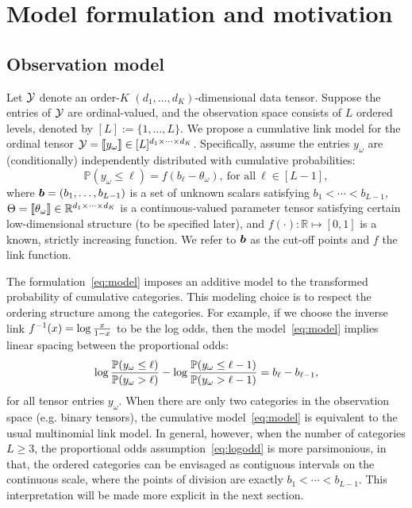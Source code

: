 \documentclass{article}
\theoremstyle{plain}
\theoremstyle{definition}
\begin{document}
\section{Model formulation and motivation}
\subsection{Observation model}
Let $\mathcal{Y}$ denote an order-$K$ $(d_1,\ldots,d_K)$-dimensional data tensor. Suppose the entries of $\mathcal{Y}$ are ordinal-valued, and the observation space consists of $L$ ordered levels, denoted by $[L]:=\{1,\ldots,L\}$. We propose a cumulative link model for the ordinal tensor $\mathcal{Y}=\llbracket y_\omega \rrbracket\in[L]^{d_1\times \cdots\times d_K}$. Specifically, assume the entries $y_\omega$ are (conditionally) independently distributed with cumulative probabilities:
\begin{equation}\label{eq:model}
\mathbb{P}(y_\omega\leq \ell)=f(b_\ell-\theta_\omega),\ \text{for all}\ \ell\in[L-1],
\end{equation}
where $\bm{b}=(b_1,\ldots,b_{L-1})$ is a set of unknown scalars satisfying $b_1<\cdots <b_{L-1}$, $\Theta=\llbracket \theta_\omega \rrbracket\in\mathbb{R}^{d_1\times \cdots \times d_K}$ is a continuous-valued parameter tensor satisfying certain low-dimensional structure (to be specified later), and $f(\cdot):\mathbb{R}\mapsto[0,1]$ is a known, strictly increasing function. We refer to $\bm{b}$ as the cut-off points and $f$ the link function. 

The formulation~\eqref{eq:model} imposes an additive model to the transformed probability of cumulative categories. This modeling choice is to respect the ordering structure among the categories. For example, if we choose the inverse link $f^{-1}(x)=\log {x\over 1-x}$ to be the log odds, then the model~\eqref{eq:model} implies linear spacing between the proportional odds:
\begin{equation}\label{eq:logodd}
\log {\mathbb{P}(y_{\omega}\leq \ell) \over \mathbb{P}(y_\omega >  \ell) } - \log {\mathbb{P}(y_{\omega}\leq {\ell-1}) \over \mathbb{P}(y_\omega >  {\ell-1}) } = b_\ell-b_{\ell-1},
\end{equation}
for all tensor entries $y_\omega$. When there are only two categories in the observation space (e.g. binary tensors), the cumulative model~\eqref{eq:model} is equivalent to the usual multinomial link model. In general, however, when the number of categories $L\geq 3$, the proportional odds assumption~\eqref{eq:logodd} is more parsimonious, in that, the ordered categories can be envisaged as contiguous intervals on the continuous scale, where the points of division are exactly $b_1<\cdots <b_{L-1}$. This interpretation will be made more explicit in the next section. 
\end{document}
